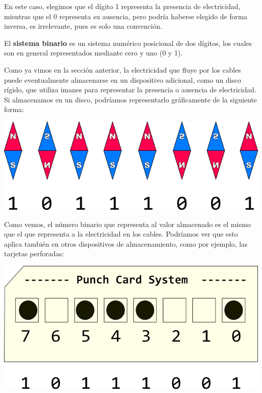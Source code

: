 En este caso, elegimos que el dígito 1 representa la presencia de electricidad,
mientras que el 0 representa su ausencia, pero podría haberse elegido de forma
inversa, es irrelevante, pues es solo una convención.

\begin{definition}
    El \textbf{sistema binario} es un sistema numérico posicional de dos
    dígitos, los cuales son en general representados mediante cero y uno (0 y 1).\autocite{laplante_2000}
\end{definition}

Como ya vimos en la sección anterior, la electricidad que fluye por los cables
puede eventualmente almacenarse en un dispositivo adicional, como un disco
rígido, que utiliza imanes para representar la presencia o ausencia de
electricidad. Si almacenamos en un disco, podríamos representarlo gráficamente
de la siguiente forma:

\centerline{\includegraphics[]{capitulos/bajo_nivel/imagenes/binary_magnets.png}}

Como vemos, el número binario que representa al valor almacenado es el mismo que
el que representa a la electricidad en los cables. Podríamos ver que esto aplica
también en otros dispositivos de almacenamiento, como por ejemplo, las tarjetas
perforadas:

\centerline{\includegraphics[]{capitulos/bajo_nivel/imagenes/binary_punchcard.png}}

